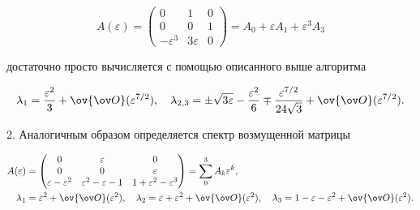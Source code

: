 \begin{equation} 


A(\varepsilon)= 


\begin{pmatrix} 


0 & 1 & 0 \\ 0 & 0 & 1 \\ 


-\varepsilon^3 & 3\varepsilon & 0 


\end{pmatrix} 


=A_0+\varepsilon A_1+\varepsilon^3 A_3 


\end{equation} 


достаточно просто вычисляется с помощью описанного выше алгоритма 


$$ 


\lambda_1=\frac{\varepsilon^2}{3}+\ov{\ov O}(\varepsilon^{7/2}), 


\quad \lambda_{2,3}=\pm\sqrt{3\varepsilon}- 


\frac{\varepsilon^2}{6}\mp\frac{\varepsilon^{7/2}}{24\sqrt{3}}+ 


\ov{\ov O}(\varepsilon^{7/2}). 


$$ 


 


2. Аналогичным образом определяется спектр возмущенной матрицы 


\begin{equation} 


\begin{split} 


A(\varepsilon)&= 


\begin{pmatrix} 


0 & \varepsilon & 0 \\ 0 & 0 & \varepsilon \\ 


\varepsilon-\varepsilon^2 & 


\varepsilon^2-\varepsilon-1 & 


1+\varepsilon^2-\varepsilon^3 


\end{pmatrix} 


=\sum^3_0 A_k\varepsilon^k,\\ 


\lambda_1&=\varepsilon^2+\ov{\ov O}(\varepsilon^2),\quad 


\lambda_2=\varepsilon+\varepsilon^2+ 


\ov{\ov O}(\varepsilon^2),\quad 


\lambda_3=1-\varepsilon-\varepsilon^2+\ov{\ov O} 


(\varepsilon^2). 


\end{split} 


\end{equation} 


